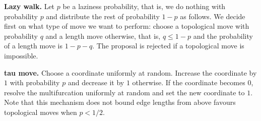 \documentclass{amsart}
\begin{document}
{\bf Lazy walk.} Let $p$ be a laziness probability, that is, we do nothing 
with probability $p$ and distribute the rest of probability $1-p$ as follows. 
We decide first on what type of move we want to perform: choose a topological 
move with probability $q$ and a length move otherwise, that is, $q \leq 1-p$
and the probability of a length move is $1-p-q$. The proposal is rejected if
a topological move is impossible. 

{\bf tau move.} Choose a coordinate uniformly at random. Increase the
coordinate by $1$ with probability $p$ and decrease it by $1$ otherwise.
If the coordinate becomes $0$, resolve the multifurcation uniformly at
random and set the new coordinate to $1$. Note that this mechanism 
does not bound edge lengths from above favours topological moves when 
$p<1/2$. 



\end{document}
